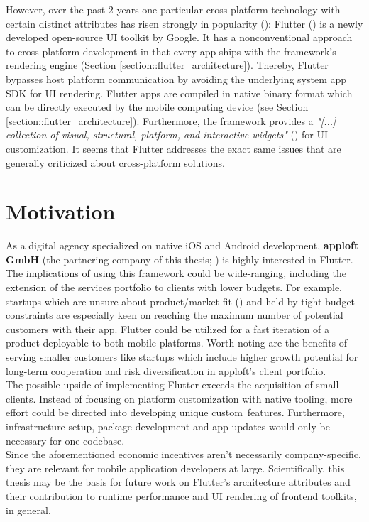 However, over the past 2 years one particular cross-platform technology with certain distinct attributes has risen strongly in popularity (\cite{Statista2021}):
Flutter (\cite{FlutterDev20}) is a newly developed open-source UI toolkit by Google. 
It has a nonconventional approach to cross-platform development in that every app ships with the framework's rendering engine (Section \ref{section::flutter_architecture}). 
Thereby, Flutter bypasses host platform communication by avoiding the underlying system app SDK for UI rendering.
Flutter apps are compiled in native binary format which can be directly executed by the mobile computing device (see Section \ref{section::flutter_architecture}).
Furthermore, the framework provides a \textit{"[...] collection of visual, structural, platform, and interactive widgets"} (\cite[l.1]{GoogleWidgets2021}) for UI customization.
It seems that Flutter addresses the exact same issues that are generally criticized about cross-platform solutions.

\section{Motivation}
\label{section:motivation}
As a digital agency specialized on native iOS and Android development, \textbf{apploft GmbH} 
(the partnering company of this thesis; \cite{apploft2021}) is highly interested in Flutter. 
The implications of using this framework could be wide-ranging, including the extension of the services portfolio
to clients with lower budgets.
For example, startups which are unsure about product/market fit (\cite{Andreesen2007}) and held by tight budget constraints are especially keen on reaching 
the maximum number of potential customers with their app. Flutter could be utilized for a fast iteration of a product deployable to 
both mobile platforms. 
Worth noting are the benefits of serving smaller customers like startups which include higher growth potential for long-term cooperation
and risk diversification in apploft's client portfolio.\\
The possible upside of implementing Flutter exceeds the acquisition of small clients. Instead of focusing on platform customization with native tooling, more effort could 
be directed into developing unique custom features.
Furthermore, infrastructure setup, package development and app updates would only be necessary for one codebase.\\
Since the aforementioned economic incentives aren't necessarily company-specific, they are relevant for mobile application developers at large.
Scientifically, this thesis may be the basis for future work on Flutter's architecture attributes and their contribution to runtime performance and UI rendering of frontend toolkits, in general.

